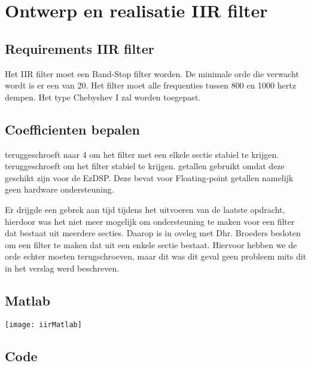 \section{Ontwerp en realisatie IIR filter}

\subsection{Requirements IIR filter}
Het IIR filter moet een Band-Stop filter worden. De minimale orde die verwacht wordt is er een van 20. Het filter moet alle frequenties tussen 800 en 1000 hertz dempen. Het type Chebyshev I zal worden toegepast.
\subsection{Coefficienten bepalen}

\begin{enumerate}[label=\emph{\alph*)}]
     teruggeschroeft naar 4 om het filter met een elkele sectie stabiel te krijgen.
     teruggeschroeft om het filter stabiel te krijgen.
     getallen gebruikt omdat deze geschikt zijn voor de EzDSP. Deze bevat voor Floating-point getallen namelijk geen hardware ondersteuning.
\end{enumerate}

Er drijgde een gebrek aan tijd tijdens het uitvoeren van de laatste opdracht, hierdoor was het niet meer mogelijk om ondersteuning te maken voor een filter dat bestaat uit meerdere secties. 
Daarop is in oveleg met Dhr. Broeders besloten om een filter te maken dat uit een enkele sectie bestaat. Hiervoor hebben we de orde echter moeten terugschroeven, maar dit was dit geval geen probleem mits dit in het verslag werd beschreven. 

\subsection{Matlab}

\texttt{[image: iirMatlab]}\par\vspace{1cm}		
\clearpage
\subsection{Code}

